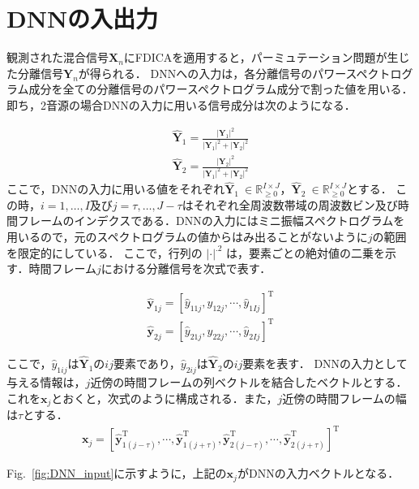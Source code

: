\section{DNNの入出力}
\label{sec:in-out}

観測された混合信号$\bm{X}_n$にFDICAを適用すると，パーミュテーション問題が生じた分離信号$\bm{Y}_n$が得られる．
DNNへの入力は，各分離信号のパワースペクトログラム成分を全ての分離信号のパワースペクトログラム成分で割った値を用いる．
即ち，2音源の場合DNNの入力に用いる信号成分は次のようになる．

\begin{align}
    \widehat{\bm{Y}}_1  = \frac{|\bm{Y}_1|^2}{|\bm{Y}_1|^2+|\bm{Y}_2|^2}\\
    \widehat{\bm{Y}}_2  = \frac{|\bm{Y}_2|^2}{|\bm{Y}_1|^2+|\bm{Y}_2|^2}
\end{align}
ここで，DNNの入力に用いる値をそれぞれ$\widehat{\bm{Y}}_1~\in \mathbb{R}_{\geq 0}^{I \times J}$，$\widehat{\bm{Y}}_2 ~\in \mathbb{R}_{\geq 0}^{I \times J}$とする．
この時，$i = 1,\ldots,I$及び$j = \tau,\ldots,J-\tau$はそれぞれ全周波数帯域の周波数ビン及び時間フレームのインデクスである．DNNの入力にはミニ振幅スペクトログラムを用いるので，元のスペクトログラムの値からはみ出ることがないように$j$の範囲を限定的にしている．
ここで，行列の $|\cdot|^{.2}$ は，要素ごとの絶対値の二乗を示す．時間フレーム$j$における分離信号を次式で表す．

\begin{align}
    \widehat{\bm{y}}_{1j}  = [\widehat{y}_{11j},y_{12j}, \cdots, \widehat{y}_{1Ij} ]^\mathrm{T}\\
    \widehat{\bm{y}}_{2j}  = [\widehat{y}_{21j},y_{22j}, \cdots, \widehat{y}_{2Ij} ]^\mathrm{T}
\end{align}

ここで，$\widehat{y}_{1ij}$は$\widehat{\bm{Y}}_1$の$ij$要素であり，$\widehat{y}_{2ij}$は$\widehat{\bm{Y}}_2$の$ij$要素を表す．
DNNの入力として与える情報は，$j$近傍の時間フレームの列ベクトルを結合したベクトルとする．
これを$\bm{x}_j$とおくと，次式のように構成される．また，$j$近傍の時間フレームの幅は$\tau$とする．
\begin{align}
    \bm{x}_j = [\widehat{\bm{y}}_{1 (j-\tau)}^\mathrm{T}, \cdots,\widehat{\bm{y}}_{1 (j+\tau)}^\mathrm{T}, \widehat{\bm{y}}_{2 (j-\tau)}^\mathrm{T},\cdots,\widehat{\bm{y}}_{2 (j+\tau)}^\mathrm{T} ]^\mathrm{T}
\end{align}

Fig.~\ref{fig:DNN_input}に示すように，上記の$\bm{x}_j$がDNNの入力ベクトルとなる．

